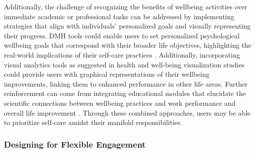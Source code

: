 Additionally, the challenge of recognizing the benefits of wellbeing activities over immediate academic or professional tasks can be addressed by implementing strategies that align with individuals' personalized goals and visually representing their progress. DMH tools could enable users to set personalized psychological wellbeing goals that correspond with their broader life objectives, highlighting the real-world implications of their self-care practices \cite{jennings2018personalized, lindhiem2016meta, agapie2022longitudinal}. Additionally, incorporating visual analytics tools as suggested in health and well-being visualization studies \cite{baumer2014reviewing, kocielnik2018reflection} could provide users with graphical representations of their wellbeing improvements, linking them to enhanced performance in other life areas. Further reinforcement can come from integrating educational modules that elucidate the scientific connections between wellbeing practices and work performance and overall life improvement \cite{howe2022design}. Through these combined approaches, users may be able to prioritize self-care amidst their manifold responsibilities.

















\subsubsection{Designing for Flexible Engagement}

